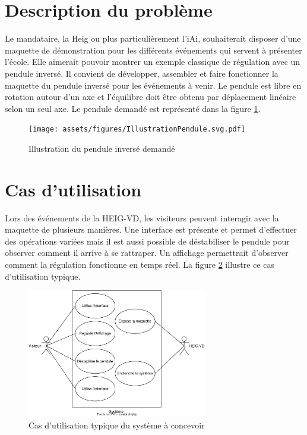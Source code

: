 \section{Description du problème}\label{sec:DescProb}
Le mandataire, la \acrshort{Heig} ou plus particulièrement l'\acrshort{iAi}, souhaiterait disposer d'une maquette de démonstration pour les différents événements qui servent à présenter l'école. Elle aimerait pouvoir montrer un exemple classique de régulation avec un pendule inversé.
Il convient de développer, assembler et faire fonctionner la maquette du pendule inversé pour les événements à venir. Le pendule est libre en rotation autour d'un axe et l'équilibre doit être obtenu par déplacement linéaire selon un seul axe. Le pendule demandé est représenté dans la figure \ref{fig:Illustration}.

\begin{figure}[H]
    \centering
    \texttt{[image: assets/figures/IllustrationPendule.svg.pdf]}
    \caption{Illustration du pendule inversé demandé}
    \label{fig:Illustration}
\end{figure}

\section{Cas d'utilisation}\label{sec:CasUtil}
Lors des événements de la HEIG-VD, les visiteurs peuvent interagir avec la maquette de plusieurs manières. Une interface est présente et permet d'effectuer des opérations variées mais il est aussi possible de déstabiliser le pendule pour observer comment il arrive à se rattraper. Un affichage permettrait d'observer comment la régulation fonctionne en temps réel.
La figure \ref{fig:CasUtil} illustre ce cas d'utilisation typique.

\begin{figure}[H]
    \centering
    \includegraphics[width = 0.7\textwidth]{assets/figures/CasUtil.drawio.svg}
    \caption{Cas d'utilisation typique  du système à concevoir}
    \label{fig:CasUtil}
\end{figure}

